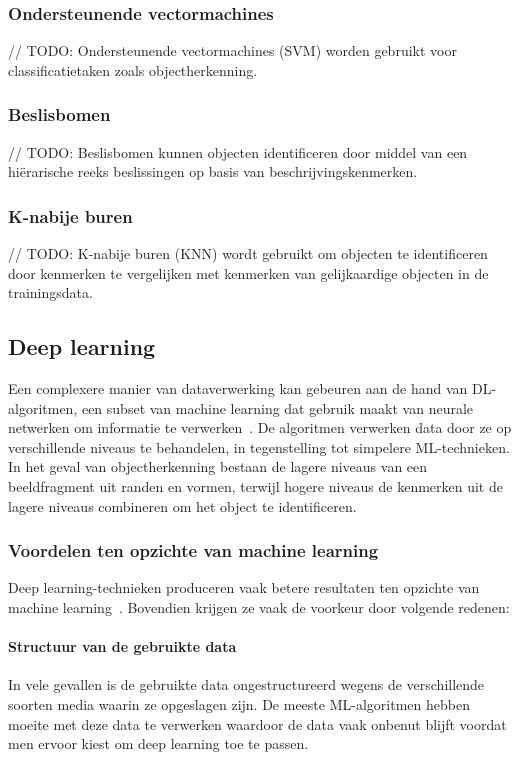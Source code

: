 \subsubsection{Ondersteunende vectormachines}
// TODO: Ondersteunende vectormachines (SVM) worden gebruikt voor classificatietaken zoals objectherkenning.

\subsubsection{Beslisbomen}
// TODO: Beslisbomen kunnen objecten identificeren door middel van een hi\"erarische reeks beslissingen op basis van beschrijvingskenmerken.

\subsubsection{K-nabije buren}
// TODO: K-nabije buren (KNN) wordt gebruikt om objecten te identificeren door kenmerken te vergelijken met kenmerken van gelijkaardige objecten in de trainingsdata.

\subsection{Deep learning}
\label{subsec:deep-learning-algoritmen}
Een complexere manier van dataverwerking kan gebeuren aan de hand van DL-algoritmen, een subset van machine learning dat gebruik maakt van neurale netwerken om informatie te verwerken~\autocite{Bozic2024}.
De algoritmen verwerken data door ze op verschillende niveaus te behandelen, in tegenstelling tot simpelere ML-technieken.
In het geval van objectherkenning bestaan de lagere niveaus van een beeldfragment uit randen en vormen, terwijl hogere niveaus de kenmerken uit de lagere niveaus combineren om het object te identificeren.

\subsubsection{Voordelen ten opzichte van machine learning}
Deep learning-technieken produceren vaak betere resultaten ten opzichte van machine learning~\autocite{Ahmed2023}.
Bovendien krijgen ze vaak de voorkeur door volgende redenen:

\paragraph{Structuur van de gebruikte data}
In vele gevallen is de gebruikte data ongestructureerd wegens de verschillende soorten media waarin ze opgeslagen zijn.
De meeste ML-algoritmen hebben moeite met deze data te verwerken waardoor de data vaak onbenut blijft voordat men ervoor kiest om deep learning toe te passen.

